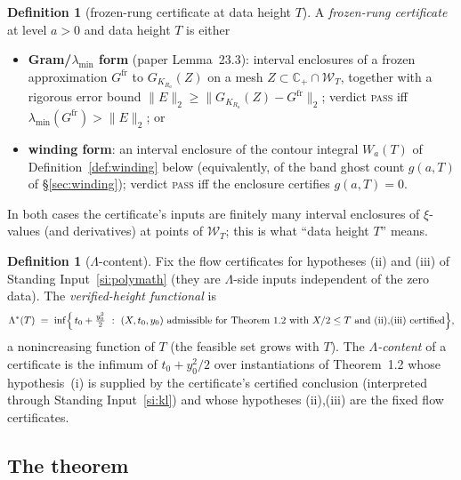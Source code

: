 \documentclass[11pt]{article}
\theoremstyle{definition}
\newtheorem{definition}[theorem]{Definition}
\theoremstyle{remark}
\newcommand{\CP}{\mathbb{C}_{+}}
\newcommand{\band}[1]{\mathcal{W}_{#1}}
\begin{document}
\begin{definition}[frozen-rung certificate at data height $T$]\label{def:cert}
A \emph{frozen-rung certificate} at level $a>0$ and data height $T$ is either
\begin{itemize}
\item[(G)] \textbf{Gram/$\lambda_{\min}$ form} (paper Lemma~23.3): interval
enclosures of a frozen approximation $G^{\mathrm{fr}}$ to $G_{K_{R_a}}(Z)$ on a mesh
$Z\subset\CP\cap\band{T}$, together with a rigorous error bound
$\|E\|_2\ge\|G_{K_{R_a}}(Z)-G^{\mathrm{fr}}\|_2$; verdict \textsc{pass} iff
$\lambda_{\min}(G^{\mathrm{fr}})>\|E\|_2$; or
\item[(W)] \textbf{winding form}: an interval enclosure of the contour
integral $W_a(T)$ of Definition~\ref{def:winding} below (equivalently, of the
band ghost count $g(a,T)$ of \S\ref{sec:winding}); verdict \textsc{pass} iff
the enclosure certifies $g(a,T)=0$.
\end{itemize}
In both cases the certificate's inputs are finitely many interval enclosures
of $\xi$-values (and derivatives) at points of $\band{T}$; this is what ``data
height $T$'' means.
\end{definition}

\begin{definition}[$\Lambda$-content]\label{def:content}
Fix the flow certificates for hypotheses (ii) and (iii) of Standing
Input~\ref{si:polymath} (they are $\Lambda$-side inputs independent of the
zero data). The \emph{verified-height functional} is
\[
\Lambda^{*}(T)\;=\;\inf\Bigl\{\,t_0+\tfrac{y_0^2}{2}\ :\
(X,t_0,y_0)\ \text{admissible for Theorem 1.2 with } X/2\le T
\text{ and (ii),(iii) certified}\Bigr\},
\]
a nonincreasing function of $T$ (the feasible set grows with $T$). The
\emph{$\Lambda$-content} of a certificate is the infimum of $t_0+y_0^2/2$ over
instantiations of Theorem~1.2 whose hypothesis~(i) is supplied by the
certificate's certified conclusion (interpreted through Standing
Input~\ref{si:kl}) and whose hypotheses (ii),(iii) are the fixed flow
certificates.
\end{definition}

\subsection{The theorem}
\end{document}
